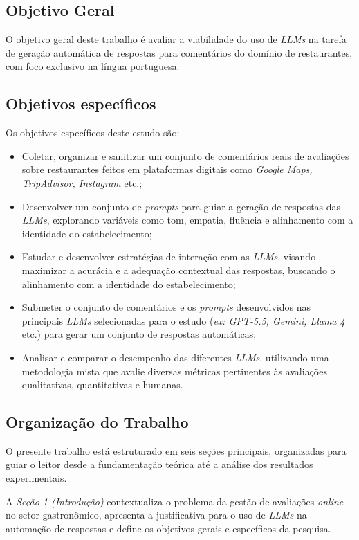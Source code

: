 \documentclass[12pt, a4paper]{article}
\numberwithin{equation}{section}
\begin{document}
\subsection{Objetivo Geral}

O objetivo geral deste trabalho é avaliar a viabilidade do uso de \textit{LLMs} na tarefa de geração automática de respostas para comentários do domínio de restaurantes, com foco exclusivo na língua portuguesa.

\subsection{Objetivos específicos}
Os objetivos específicos deste estudo são:
\begin{itemize}
 \item Coletar, organizar e sanitizar um conjunto de comentários reais de avaliações sobre restaurantes feitos em plataformas digitais como \textit{Google Maps, TripAdvisor, Instagram} etc.;
 \item Desenvolver um conjunto de \textit{prompts} para guiar a geração de respostas das \textit{LLMs}, explorando variáveis como tom, empatia, fluência e alinhamento com a identidade do estabelecimento;
 \item Estudar e desenvolver estratégias de interação com as \textit{LLMs}, visando maximizar a acurácia e a adequação contextual das respostas, buscando o alinhamento com a identidade do estabelecimento;
 \item Submeter o conjunto de comentários e os \textit{prompts} desenvolvidos nas principais \textit{LLMs} selecionadas para o estudo (\textit{ex: GPT-5.5, Gemini, Llama 4} etc.) para gerar um conjunto de respostas automáticas;
\item Analisar e comparar o desempenho das diferentes \textit{LLMs}, utilizando uma metodologia mista que avalie diversas métricas pertinentes às avaliações qualitativas, quantitativas e humanas.
\end{itemize}

\subsection{Organização do Trabalho}

O presente trabalho está estruturado em seis seções principais, organizadas para guiar o leitor desde a fundamentação teórica até a análise dos resultados experimentais.

A \textit{Seção 1 (Introdução)} contextualiza o problema da gestão de avaliações \textit{online} no setor gastronômico, apresenta a justificativa para o uso de \textit{LLMs} na automação de respostas e define os objetivos gerais e específicos da pesquisa.
\end{document}
